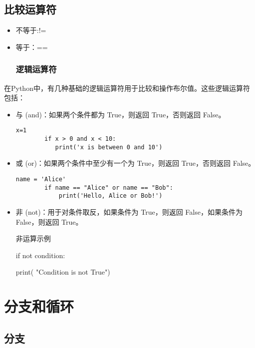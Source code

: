 \documentclass{article}
\begin{document}
\subsection{比较运算符}
\begin{itemize}
 \item 不等于:!=
 \item 等于：==
\subsubsection{逻辑运算符}
\end{itemize}
\par 
在Python中，有几种基础的逻辑运算符用于比较和操作布尔值。这些逻辑运算符包括：
\begin{itemize}
    \item 与 (and)：如果两个条件都为 True，则返回 True，否则返回 False。
    \begin{lstlisting}[caption={示例Python代码}]
        x=1
        if x > 0 and x < 10:
           print('x is between 0 and 10')
    \end{lstlisting}
    \item 或 (or)：如果两个条件中至少有一个为 True，则返回 True，否则返回 False。
    \begin{lstlisting}[caption={示例Python代码}]
        name = 'Alice'
        if name == "Alice" or name == "Bob":
            print('Hello, Alice or Bob!')
    \end{lstlisting}
    \item 非 (not)：用于对条件取反，如果条件为 True，则返回 False，如果条件为 False，则返回 True。
    \par 非运算示例
    \par if not condition:
        \par print( "Condition is not True")
\end{itemize}
\section{分支和循环}
 \subsection{分支}
\end{document}
